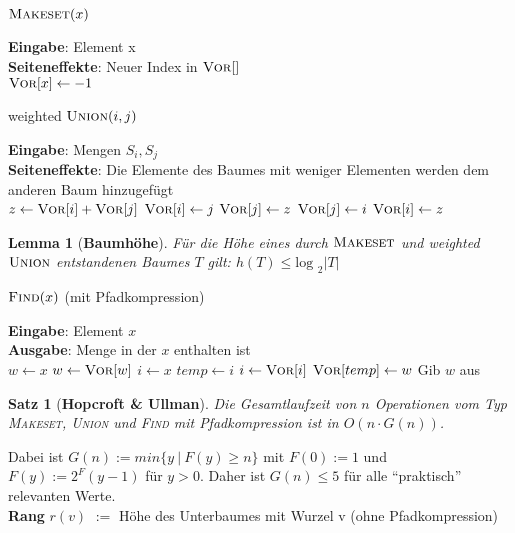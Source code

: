 \documentclass[a4paper,10pt]{scrartcl}
\newcommand{\tbf}{\textbf}
\newcommand{\tsc}{\textsc}
\newcommand{\agn}{\leftarrow}
\newcommand{\Eingabe}[1]{\STATE \tbf{Eingabe}: #1 \\}
\newcommand{\Ausgabe}[1]{\STATE \tbf{Ausgabe}: #1 \\}
\newcommand{\Seffekte}[1]{\STATE \tbf{Seiteneffekte}: #1 \\}
\newtheorem{satz}{Satz}
\newtheorem{lemma}{Lemma}
\begin{document}
\begin{algorithm}
\caption{$\tsc{Makeset}(x)$}
\begin{algorithmic}
\Eingabe{Element x}
\Seffekte{Neuer Index in $\tsc{Vor}[]$}
\STATE $\tsc{Vor}[x] \agn - 1$
\end{algorithmic}
\end{algorithm}

\begin{algorithm}
\caption{weighted $\tsc{Union}(i,j)$}
\begin{algorithmic}
\Eingabe{Mengen $S_i, S_j$}
\Seffekte{Die Elemente des Baumes mit weniger Elementen werden dem anderen Baum hinzugefügt}
\STATE $z \agn \tsc{Vor}[i] + \tsc{Vor}[j]$
\IF{|\tsc{Vor}[i]| < |\tsc{Vor}[j]|}
	\STATE $\tsc{Vor}[i] \agn j$
	\STATE $\tsc{Vor}[j] \agn z$
\ELSE 
	\STATE $\tsc{Vor}[j] \agn i$
	\STATE $\tsc{Vor}[i] \agn z$
\ENDIF
\end{algorithmic}
\end{algorithm}

\begin{lemma}[\tbf{Baumhöhe}]
 Für die Höhe eines durch $\tsc{Makeset}$ und weighted $\tsc{Union}$ entstandenen Baumes $T$ gilt: $h(T) \leq \text{log }_2 |T|$
\end{lemma}

\begin{algorithm}
\caption{$\tsc{Find}(x)$ (mit Pfadkompression)}
\begin{algorithmic}
\Eingabe{Element $x$}
\Ausgabe{Menge in der $x$ enthalten ist}
\STATE $w \agn x$
\WHILE{$\tsc{Vor}[w] > 0$}
	\STATE $w \agn \tsc{Vor}[w]$
\ENDWHILE
\STATE $i \agn x$
\WHILE{$\tsc{Vor}[i] > 0$}
	\STATE $temp \agn i$
	\STATE $i \agn \tsc{Vor}[i]$
	\STATE $\tsc{Vor}[temp] \agn w$
\ENDWHILE
\STATE Gib $w$ aus
\end{algorithmic}
\end{algorithm}

\begin{satz}[\tbf{Hopcroft \& Ullman}] 
 Die Gesamtlaufzeit von $n$ Operationen vom Typ \tsc{Makeset}, \tsc{Union} und \tsc{Find} mit Pfadkompression ist in $O(n \cdot G(n))$.
\end{satz}

Dabei ist $G(n) := min\{y \ | \ F(y) \geq n\}$ mit $F(0) := 1$ und $F(y) := 2^F(y-1)$ für $y > 0$. Daher ist $G(n) \leq 5$ für alle ``praktisch'' relevanten Werte. \\

\tbf{Rang} $r(v)$ $:=$ Höhe des Unterbaumes mit Wurzel v (ohne Pfadkompression) \\
\end{document}
